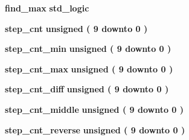 \begin{DoxyCompactItemize}
\item 
{\bf find\+\_\+max} {\bfseries \textcolor{comment}{std\+\_\+logic}\textcolor{vhdlchar}{ }} 
\item 
{\bf step\+\_\+cnt} {\bfseries \textcolor{comment}{unsigned}\textcolor{vhdlchar}{ }\textcolor{vhdlchar}{(}\textcolor{vhdlchar}{ }\textcolor{vhdlchar}{ } \textcolor{vhdldigit}{9} \textcolor{vhdlchar}{ }\textcolor{keywordflow}{downto}\textcolor{vhdlchar}{ }\textcolor{vhdlchar}{ } \textcolor{vhdldigit}{0} \textcolor{vhdlchar}{ }\textcolor{vhdlchar}{)}\textcolor{vhdlchar}{ }} 
\item 
{\bf step\+\_\+cnt\+\_\+min} {\bfseries \textcolor{comment}{unsigned}\textcolor{vhdlchar}{ }\textcolor{vhdlchar}{(}\textcolor{vhdlchar}{ }\textcolor{vhdlchar}{ } \textcolor{vhdldigit}{9} \textcolor{vhdlchar}{ }\textcolor{keywordflow}{downto}\textcolor{vhdlchar}{ }\textcolor{vhdlchar}{ } \textcolor{vhdldigit}{0} \textcolor{vhdlchar}{ }\textcolor{vhdlchar}{)}\textcolor{vhdlchar}{ }} 
\item 
{\bf step\+\_\+cnt\+\_\+max} {\bfseries \textcolor{comment}{unsigned}\textcolor{vhdlchar}{ }\textcolor{vhdlchar}{(}\textcolor{vhdlchar}{ }\textcolor{vhdlchar}{ } \textcolor{vhdldigit}{9} \textcolor{vhdlchar}{ }\textcolor{keywordflow}{downto}\textcolor{vhdlchar}{ }\textcolor{vhdlchar}{ } \textcolor{vhdldigit}{0} \textcolor{vhdlchar}{ }\textcolor{vhdlchar}{)}\textcolor{vhdlchar}{ }} 
\item 
{\bf step\+\_\+cnt\+\_\+diff} {\bfseries \textcolor{comment}{unsigned}\textcolor{vhdlchar}{ }\textcolor{vhdlchar}{(}\textcolor{vhdlchar}{ }\textcolor{vhdlchar}{ } \textcolor{vhdldigit}{9} \textcolor{vhdlchar}{ }\textcolor{keywordflow}{downto}\textcolor{vhdlchar}{ }\textcolor{vhdlchar}{ } \textcolor{vhdldigit}{0} \textcolor{vhdlchar}{ }\textcolor{vhdlchar}{)}\textcolor{vhdlchar}{ }} 
\item 
{\bf step\+\_\+cnt\+\_\+middle} {\bfseries \textcolor{comment}{unsigned}\textcolor{vhdlchar}{ }\textcolor{vhdlchar}{(}\textcolor{vhdlchar}{ }\textcolor{vhdlchar}{ } \textcolor{vhdldigit}{9} \textcolor{vhdlchar}{ }\textcolor{keywordflow}{downto}\textcolor{vhdlchar}{ }\textcolor{vhdlchar}{ } \textcolor{vhdldigit}{0} \textcolor{vhdlchar}{ }\textcolor{vhdlchar}{)}\textcolor{vhdlchar}{ }} 
\item 
{\bf step\+\_\+cnt\+\_\+reverse} {\bfseries \textcolor{comment}{unsigned}\textcolor{vhdlchar}{ }\textcolor{vhdlchar}{(}\textcolor{vhdlchar}{ }\textcolor{vhdlchar}{ } \textcolor{vhdldigit}{9} \textcolor{vhdlchar}{ }\textcolor{keywordflow}{downto}\textcolor{vhdlchar}{ }\textcolor{vhdlchar}{ } \textcolor{vhdldigit}{0} \textcolor{vhdlchar}{ }\textcolor{vhdlchar}{)}\textcolor{vhdlchar}{ }} 

\end{DoxyCompactItemize}
